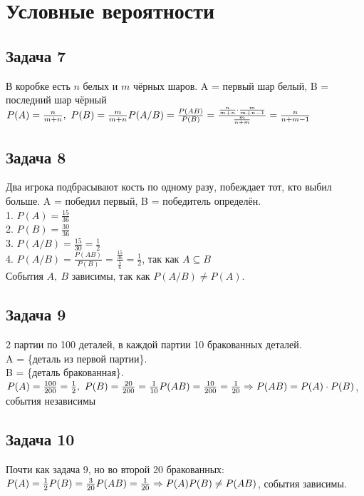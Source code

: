 \documentclass[12pt, a4paper]{article}
\begin{document}
    \section*{Условные вероятности}
    \subsection*{Задача 7}
    В коробке есть $n$ белых и $m$ чёрных шаров. A = первый шар белый, B = последний шар чёрный\\
    $P(A) = \frac{n}{m + n},\ P(B) = \frac{m}{m + n}\\
    P(A/B) = \frac{P(AB)}{P(B)} = \frac{\frac{n}{m + n}\cdot \frac{m}{m + n - 1}}{\frac{m}{n + m}} = \frac{n}{n + m - 1}$
    \subsection*{Задача 8}
    Два игрока подбрасывают кость по одному разу, побеждает тот, кто выбил больше. A = победил первый, B = победитель определён.\\
    1. $P(A) = \frac{15}{36}$\\
    2. $P(B) = \frac{30}{36}$\\
    3. $P(A/B) = \frac{15}{30} = \frac{1}{2}$\\
    4. $P(A/B) = \frac{P(AB)}{P(B)} = \frac{\frac{15}{36}}{\frac{5}{6}} = \frac{1}{2}$, так как $A\subseteq B$\\
    События $A,\ B$ зависимы, так как $P(A/B) \neq P(A)$.
    \subsection*{Задача 9}
    2 партии по 100 деталей, в каждой партии 10 бракованных деталей.\\
    A = \{деталь из первой партии\}.\\
    B = \{деталь бракованная\}.\\
    $P(A) = \frac{100}{200} = \frac{1}{2},\ P(B) = \frac{20}{200} = \frac{1}{10}\\
    P(AB) = \frac{10}{200} = \frac{1}{20}\Rightarrow P(AB) = P(A)\cdot P(B)$, события независимы
    \subsection*{Задача 10}
    Почти как задача 9, но во второй 20 бракованных:\\
    $P(A) = \frac{1}{2}\\
    P(B) = \frac{3}{20}\\
    P(AB) = \frac{1}{20}\Rightarrow P(A)P(B)\neq P(AB)$, события зависимы.
\end{document}
